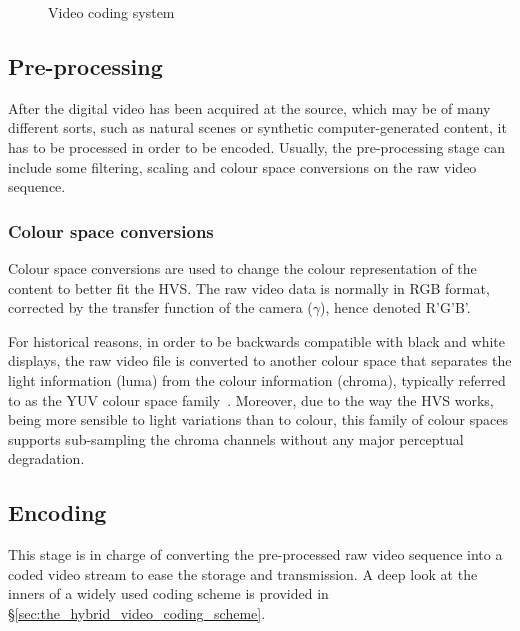 \documentclass[11pt,a4paper,openright,twoside]{book}
\numberwithin{equation}{section} %
\numberwithin{figure}{section} %
\numberwithin{table}{section} %
\begin{document}
\begin{figure}[tb]
	\centering
	
	\caption{Video coding system}
	\label{fig:video_coding_system}
\end{figure}

\subsection{Pre-processing}
\label{sub:pre_processing}

After the digital video has been acquired at the source, which may be of
many different sorts, such as natural scenes or synthetic
computer-generated content, it has to be processed in order to be
encoded.
Usually, the pre-processing stage can include some filtering, scaling
and colour space conversions on the raw video sequence.

\subsubsection{Colour space conversions}
\label{ssub:colour_space_conversions}

Colour space conversions are used to change the colour
representation of the content to better fit the \ac{HVS}.
The raw video data is normally in \ac{RGB} format, corrected by the
transfer function of the camera ($\gamma$), hence denoted R'G'B'.

For historical reasons, in order to be backwards compatible with black
and white displays, the raw video file is converted to another colour
space that separates the light information (luma) from the colour
information (chroma), typically referred to as the YUV colour space
family~\cite{poynton-95-color-space}.
Moreover, due to the way the \ac{HVS} works, being more sensible to
light variations than to colour, this family of colour spaces supports
sub-sampling the chroma channels without any major perceptual
degradation.

\subsection{Encoding}
\label{sub:encoding}

This stage is in charge of converting the pre-processed raw video sequence
into a coded video stream to ease the storage and transmission.
A deep look at the inners of a widely used coding scheme is provided
in \S\ref{sec:the_hybrid_video_coding_scheme}.
\end{document}
